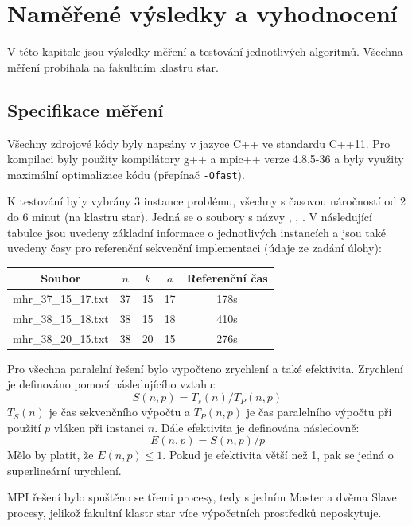 \documentclass{article}
\begin{document}
\section{Naměřené výsledky a vyhodnocení}

V této kapitole jsou výsledky měření a testování jednotlivých algoritmů. Všechna měření probíhala na fakultním klastru star.

\subsection{Specifikace měření}
Všechny zdrojové kódy byly napsány v jazyce C++ ve standardu C++11. Pro kompilaci byly použity kompilátory g++ a mpic++ verze 4.8.5-36 a byly využity maximální optimalizace kódu (přepínač \texttt{-Ofast}). 

K testování byly vybrány 3 instance problému, všechny s časovou náročností od 2 do 6 minut (na klastru star). Jedná se o soubory s názvy , , . V následující tabulce jsou uvedeny základní informace o jednotlivých instancích a jsou také uvedeny časy pro referenční sekvenční implementaci (údaje ze zadání úlohy):

\begin{table}[H]\centering
    \begin{tabular}{|c|c|c|c|c|}
        \hline \textbf{Soubor} & $n$ & $k$  & $a$ & \textbf{Referenční čas} \\ \hline \hline
    	mhr\_37\_15\_17.txt & 37 & 15 & 17 & 178s \\  \hline
    	mhr\_38\_15\_18.txt & 38 & 15 & 18 & 410s \\  \hline
    	mhr\_38\_20\_15.txt & 38 & 20 & 15 & 276s \\  \hline
    \end{tabular}
\end{table} 

Pro všechna paralelní řešení bylo vypočteno zrychlení a také efektivita. Zrychlení je definováno pomocí následujícího vztahu:
$$S(n,p) = T_s(n)/T_P(n,p)$$ 
$T_S(n)$ je čas sekvenčního výpočtu a $T_P(n,p)$ je čas paralelního výpočtu při použití $p$ vláken při instanci $n$. Dále efektivita je definována následovně:
$$E(n,p) = S(n,p)/p$$
Mělo by platit, že $E(n,p) \leq 1$. Pokud je efektivita větší než 1, pak se jedná o superlineární urychlení.

MPI řešení bylo spuštěno se třemi procesy, tedy s jedním Master a dvěma Slave procesy, jelikož fakultní klastr star více výpočetních prostředků neposkytuje.
\end{document}
